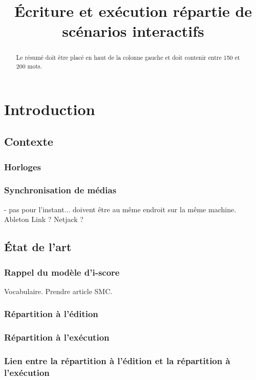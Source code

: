 \documentclass{article}
\title{Écriture et exécution répartie de scénarios interactifs}
\begin{document}
\maketitle
\begin{abstract}
Le résumé doit être placé en haut de la colonne gauche et doit contenir entre 150 et 200 mots.
\end{abstract}
\section{Introduction}
\subsection{Contexte}

\subsubsection{Horloges}
\subsubsection{Synchronisation de médias}
- pas pour l'instant... doivent être au même endroit sur la même machine.
Ableton Link ? Netjack ?
\subsection{État de l'art}
\subsubsection{Rappel du modèle d'i-score}
Vocabulaire. Prendre article SMC.
\subsubsection{Répartition à l'édition}
\subsubsection{Répartition à l'exécution}
\subsubsection{Lien entre la répartition à l'édition et la répartition à l'exécution}

\begin{figure}[h]
	\centering
	\begin{tikzpicture}
	
	\end{tikzpicture}
\end{figure}
\end{document}
